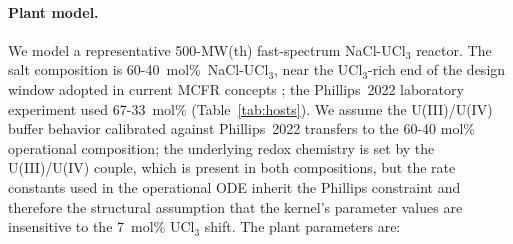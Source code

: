 \documentclass[11pt]{article}
\theoremstyle{plain}
\theoremstyle{definition}
\theoremstyle{remark}
\begin{document}
\paragraph{Plant model.}
We model a representative 500-MW(th) fast-spectrum NaCl-UCl$_3$ reactor.
The salt composition is 60-40~mol\%~NaCl-UCl$_3$, near the UCl$_3$-rich end
of the design window adopted in current MCFR concepts
\citep{Mausolf2024,TerraPower2021,Tomeck2024MCFR}; the Phillips~2022
laboratory experiment used 67-33~mol\% (Table~\ref{tab:hosts}).  We assume
the U(III)/U(IV) buffer behavior calibrated against Phillips~2022 transfers
to the 60-40 mol\% operational composition; the underlying redox chemistry
is set by the U(III)/U(IV) couple, which is present in both compositions,
but the rate constants used in the operational ODE inherit the Phillips
constraint and therefore the structural assumption that the kernel's
parameter values are insensitive to the 7~mol\% UCl$_3$ shift.  The plant
parameters are:
\end{document}
